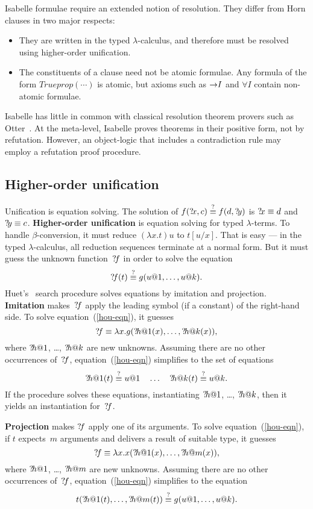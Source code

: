 Isabelle formulae require an extended notion of resolution.
They differ from Horn clauses in two major respects:
\begin{itemize}
  \item They are written in the typed $\lambda$-calculus, and therefore must be
resolved using higher-order unification.

\item The constituents of a clause need not be atomic formulae.  Any
  formula of the form $Trueprop(\cdots)$ is atomic, but axioms such as
  ${\rightarrow}I$ and $\forall I$ contain non-atomic formulae.
\end{itemize}
Isabelle has little in common with classical resolution theorem provers
such as Otter~\cite{wos-bledsoe}.  At the meta-level, Isabelle proves
theorems in their positive form, not by refutation.  However, an
object-logic that includes a contradiction rule may employ a refutation
proof procedure.


\subsection{Higher-order unification}
Unification is equation solving.  The solution of $f({?\!x},c) \stackrel{?}{\equiv}
f(d,{?\!y})$ is ${?\!x}\equiv d$ and ${?\!y}\equiv c$.  {\bf
Higher-order unification} is equation solving for typed $\lambda$-terms.
To handle $\beta$-conversion, it must reduce $(\lambda x.t)u$ to $t[u/x]$.
That is easy --- in the typed $\lambda$-calculus, all reduction sequences
terminate at a normal form.  But it must guess the unknown
function~${?\!f}$ in order to solve the equation
\begin{equation} \label{hou-eqn}
 {?\!f}(t) \stackrel{?}{\equiv} g(u@1,\ldots,u@k).
\end{equation}
Huet's~\cite{huet75} search procedure solves equations by imitation and
projection.  {\bf Imitation} makes~${?\!f}$ apply the leading symbol (if a
constant) of the right-hand side.  To solve equation~(\ref{hou-eqn}), it
guesses
\[ {?\!f} \equiv \lambda x. g({?\!h@1}(x),\ldots,{?\!h@k}(x)), \]
where ${?\!h@1}$, \ldots, ${?\!h@k}$ are new unknowns.  Assuming there are no
other occurrences of~${?\!f}$, equation~(\ref{hou-eqn}) simplifies to the
set of equations
\[ {?\!h@1}(t)\stackrel{?}{\equiv} u@1 \quad\ldots\quad {?\!h@k}(t)\stackrel{?}{\equiv} u@k. \]
If the procedure solves these equations, instantiating ${?\!h@1}$, \ldots,
${?\!h@k}$, then it yields an instantiation for~${?\!f}$.

{\bf Projection} makes ${?\!f}$ apply one of its arguments.  To solve
equation~(\ref{hou-eqn}), if $t$ expects~$m$ arguments and delivers a
result of suitable type, it guesses
\[ {?\!f} \equiv \lambda x. x({?\!h@1}(x),\ldots,{?\!h@m}(x)), \]
where ${?\!h@1}$, \ldots, ${?\!h@m}$ are new unknowns.  Assuming there are no
other occurrences of~${?\!f}$, equation~(\ref{hou-eqn}) simplifies to the 
equation 
\[ t({?\!h@1}(t),\ldots,{?\!h@m}(t)) \stackrel{?}{\equiv} g(u@1,\ldots,u@k). \]

